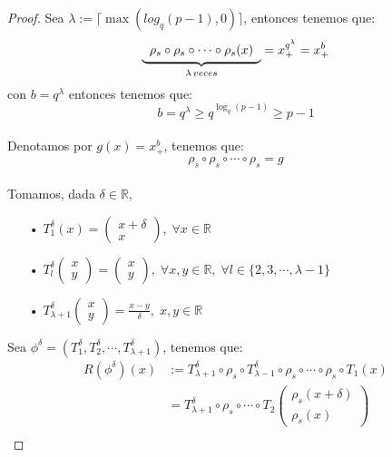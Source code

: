 \documentclass[12pt,a4paper]{book}
\providecommand{\conj}[1]{\lbrace#1\rbrace}
\begin{document}
\begin{proof}
Sea $\lambda:=\lceil \max(log_{q}(p-1),0) \rceil$, entonces tenemos que:
\begin{equation*}
\begin{split}
\underbrace{
\begin{tabular}{c}
$\rho_{s}\circ\rho_{s}\circ\cdots\circ\rho_{s}(x)$
\end{tabular}}_{\lambda\,veces}
=x_{+}^{q^{\lambda}}=x_{+}^{b}
\end{split}
\end{equation*}
con $b=q^{\lambda}$ entonces tenemos que: $$b=q^{\lambda}\geq q^{\log_{q}(p-1)}\geq p-1$$
\\
Denotamos por $g(x)=x_{+}^{b}$, tenemos que: $$\rho_{s}\circ\rho_{s}\circ\cdots\circ\rho_{s}=g$$
\\
Tomamos, dada $\delta\in\mathbb{R}$,
\begin{enumerate}
\item[•] $T_{1}^{\delta}(x)=\left(\begin{matrix}
x+\delta\\
x
\end{matrix}\right),\;\forall x\in\mathbb{R}$
\item[•] $T_{l}^{\delta}\left(\begin{matrix} x\\y\end{matrix}\right)
=\left(\begin{matrix} x\\y\end{matrix}\right),\;\forall x,y\in\mathbb{R},\;\forall l\in\conj{2,3,\cdots,\lambda-1}$
\item[•] $T_{\lambda +1}^{\delta}\left(\begin{matrix} x\\y\end{matrix}\right)=\frac{x-y}{\delta},\;x,y\in\mathbb{R}$
\end{enumerate}
Sea $\phi^{\delta}=(T_{1}^{\delta},T_{2}^{\delta},\cdots,T_{\lambda +1}^{\delta})$, tenemos que:
\begin{equation*}
\begin{split}
R(\phi^{\delta})(x)&:=T_{\lambda+1}^{\delta}\circ\rho_{s}\circ T_{\lambda-1}^{\delta}\circ\rho_{s}\circ\cdots\circ\rho_{s}\circ T_{1}(x)\\&
=T_{\lambda +1}^{\delta}\circ\rho_{s}\circ\cdots\circ T_{2}\left(\begin{matrix}
\rho_{s}(x+\delta)\\
\rho_{s}(x)
\end{matrix}\right)\\&

\end{split}
\end{equation*}
\end{proof}
\end{document}
